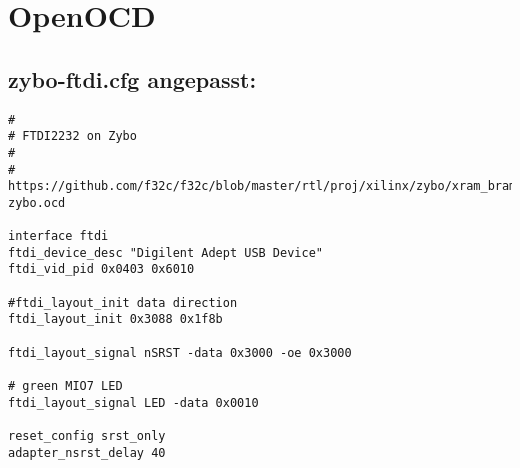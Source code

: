 





\section{OpenOCD}

\subsection{zybo-ftdi.cfg angepasst:}
\label{anhang:zybo-ftdi.cfg}
\lstset{language=tcl}
\begin{lstlisting}
#
# FTDI2232 on Zybo
#
#  https://github.com/f32c/f32c/blob/master/rtl/proj/xilinx/zybo/xram_bram_hdmi_ise/ftdi-zybo.ocd 

interface ftdi
ftdi_device_desc "Digilent Adept USB Device"
ftdi_vid_pid 0x0403 0x6010

#ftdi_layout_init data direction
ftdi_layout_init 0x3088 0x1f8b

ftdi_layout_signal nSRST -data 0x3000 -oe 0x3000

# green MIO7 LED
ftdi_layout_signal LED -data 0x0010

reset_config srst_only
adapter_nsrst_delay 40
\end{lstlisting}


